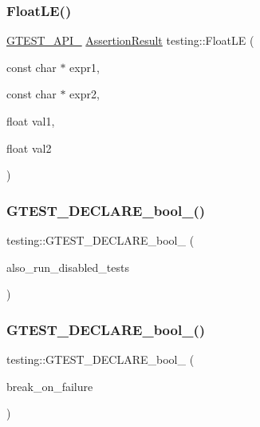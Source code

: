 \mbox{\label{namespacetesting_a69106491c2e7f50e50da0ce5e8ae4374}} 
\subsubsection{\texorpdfstring{FloatLE()}{FloatLE()}}
{\footnotesize\ttfamily \mbox{\hyperlink{gtest-port_8h_aa73be6f0ba4a7456180a94904ce17790}{G\+T\+E\+S\+T\+\_\+\+A\+P\+I\+\_\+}} \mbox{\hyperlink{classtesting_1_1_assertion_result}{Assertion\+Result}} testing\+::\+Float\+LE (\begin{DoxyParamCaption}\item[{const char $\ast$}]{expr1,  }\item[{const char $\ast$}]{expr2,  }\item[{float}]{val1,  }\item[{float}]{val2 }\end{DoxyParamCaption})}

\mbox{\label{namespacetesting_a4c08ba9fcb0581c61e25968e520efa48}} 
\subsubsection{\texorpdfstring{GTEST\_DECLARE\_bool\_()}{GTEST\_DECLARE\_bool\_()}\hspace{0.1cm}{\footnotesize\ttfamily [1/8]}}
{\footnotesize\ttfamily testing\+::\+G\+T\+E\+S\+T\+\_\+\+D\+E\+C\+L\+A\+R\+E\+\_\+bool\+\_\+ (\begin{DoxyParamCaption}\item[{also\+\_\+run\+\_\+disabled\+\_\+tests}]{ }\end{DoxyParamCaption})}

\mbox{\label{namespacetesting_a5868c3980b2f69f511fc8c3de7cdfc17}} 
\subsubsection{\texorpdfstring{GTEST\_DECLARE\_bool\_()}{GTEST\_DECLARE\_bool\_()}\hspace{0.1cm}{\footnotesize\ttfamily [2/8]}}
{\footnotesize\ttfamily testing\+::\+G\+T\+E\+S\+T\+\_\+\+D\+E\+C\+L\+A\+R\+E\+\_\+bool\+\_\+ (\begin{DoxyParamCaption}\item[{break\+\_\+on\+\_\+failure}]{ }\end{DoxyParamCaption})}

